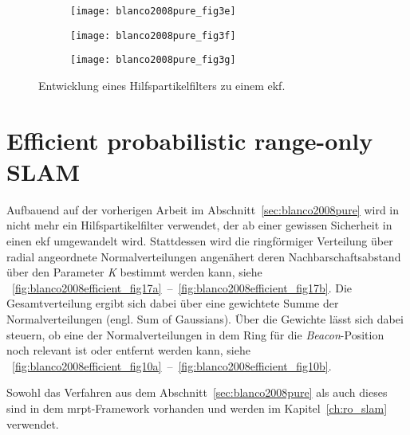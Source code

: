 \begin{figure}
	\begin{subfigure}[t]{0.3\linewidth}
		\texttt{[image: blanco2008pure\_fig3e]}
		\caption{}
		\label{fig:blanco2008pure_fig3e}
	\end{subfigure}
	\hfill
	\begin{subfigure}[t]{0.3\linewidth}
		\texttt{[image: blanco2008pure\_fig3f]}
		\caption{}
		\label{fig:blanco2008pure_fig3f}
	\end{subfigure}
	\hfill
	\begin{subfigure}[t]{0.3\linewidth}
		\texttt{[image: blanco2008pure\_fig3g]}
		\caption{}
		\label{fig:blanco2008pure_fig3g}
	\end{subfigure}
	\caption{Entwicklung eines Hilfspartikelfilters zu einem \Gls{ekf}.}
	\label{fig:blanco2008pure_fig3}
\end{figure}


\begin{comment}
------------------------------------------------------------------------------------------
- \cite{blanco2008efficient}
	- Efficient probabilistic range-only SLAM (71)
\end{comment}
\section{Efficient probabilistic range-only SLAM}\label{sec:blanco2008efficient}

Aufbauend auf der vorherigen Arbeit im Abschnitt~\ref{sec:blanco2008pure} wird in  \cite{blanco2008efficient} nicht mehr ein Hilfspartikelfilter verwendet, der ab einer gewissen Sicherheit in einen \Gls{ekf} umgewandelt wird. Stattdessen wird die ringförmiger Verteilung über radial angeordnete Normalverteilungen angenähert deren Nachbarschaftsabstand über den Parameter \textit{K} bestimmt werden kann, siehe \figurename~\ref{fig:blanco2008efficient_fig17a}~--~\ref{fig:blanco2008efficient_fig17b}. Die Gesamtverteilung ergibt sich dabei über eine gewichtete Summe der Normalverteilungen (engl. Sum of Gaussians). Über die Gewichte lässt sich dabei steuern, ob eine der Normalverteilungen in dem Ring für die \textit{Beacon}-Position noch relevant ist oder entfernt werden kann, siehe \figurename~\ref{fig:blanco2008efficient_fig10a}~--~\ref{fig:blanco2008efficient_fig10b}.

Sowohl das Verfahren aus dem Abschnitt~\ref{sec:blanco2008pure} als auch dieses sind in dem \Gls{mrpt}-Framework vorhanden und werden im Kapitel~\ref{ch:ro_slam} verwendet.

